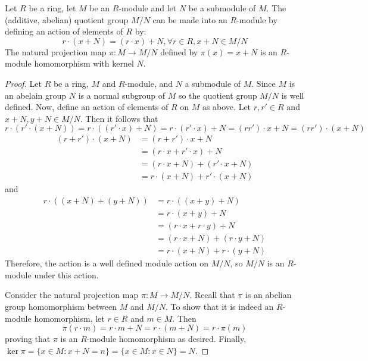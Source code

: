 \documentclass[12pt, a4paper, oneside, openright, titlepage]{book}
\begin{document}
\begin{prop}
    Let $R$ be a ring, let $M$ be an $R$-module and let $N$ be a submodule of $M$. The (additive, abelian) quotient group $M/N$ can be made into an $R$-module by defining an action of elements of $R$ by: \begin{equation*}
        r\cdot(x+N) = (r\cdot x)+N,\forall r \in R, x+N \in M/N
    \end{equation*}
    The natural projection map $\pi:M\rightarrow M/N$ defined by $\pi(x) = x+N$ is an $R$-module homomorphism with kernel $N$.
\end{prop}
\begin{proof}
    Let $R$ be a ring, $M$ and $R$-module, and $N$ a submodule of $M$. Since $M$ is an abelain group $N$ is a normal subgroup of $M$ so the quotient group $M/N$ is well defined. Now, define an action of elements of $R$ on $M$ as above. Let $r,r' \in R$ and $x+N,y+N \in M/N$. Then it follows that \begin{equation*}
        r\cdot(r'\cdot(x+N)) = r\cdot((r'\cdot x)+N) = r\cdot(r'\cdot x)+N = (rr')\cdot x + N = (rr')\cdot(x+N)
    \end{equation*}
    \begin{align*}
        (r+r')\cdot(x+N) &= (r+r')\cdot x+N \\
        &= (r\cdot x + r'\cdot x)+N \\
        &= (r\cdot x + N) + (r'\cdot x + N) \\
        &= r\cdot(x+N)+r'\cdot(x+N)
    \end{align*}
    and \begin{align*}
        r\cdot ((x+N)+(y+N)) &= r\cdot((x+y)+N) \\
        &= r\cdot(x+y)+N \\
        &= (r\cdot x + r\cdot y) + N\\
        &= (r\cdot x + N) + (r\cdot y +N) \\
        &= r\cdot (x+N) +r\cdot (y+N)
    \end{align*}
    Therefore, the action is a well defined module action on $M/N$, so $M/N$ is an $R$-module under this action.

    Consider the natural projection map $\pi:M\rightarrow M/N$. Recall that $\pi$ is an abelian group homomorphism between $M$ and $M/N$. To show that it is indeed an $R$-module homomorphism, let $r \in R$ and $m \in M$. Then \begin{equation*}
        \pi(r\cdot m) = r\cdot m + N = r\cdot(m+N) = r\cdot \pi(m)
    \end{equation*}
    proving that $\pi$ is an $R$-module homomorphism as desired. Finally, $\ker\pi = \{x \in M:x+N = n\} = \{x\in M:x \in N\} = N$.
\end{proof}
\end{document}
